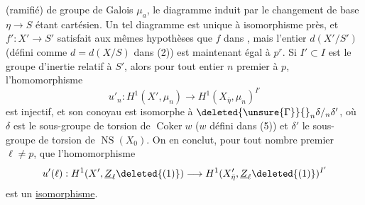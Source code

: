 
  (ramifié) de  groupe de Galois $\mu_a$, le diagramme  induit par le changement de base $\eta\longrightarrow S$ étant cartésien. Un tel diagramme est unique à isomorphisme près,  et $f':X'\longrightarrow S'$ satisfait aux mêmes hypothèses  que $f$ dans \qquad, mais l'entier $d(X'/S')$ (défini comme $d=d(X/S)$ dans (2)) est maintenant  égal à $p^r$.
Si $I'\subset I$ est le groupe d'inertie  relatif à $S'$, alors pour tout entier $n$ premier à $p$, l'homomorphisme
\[
u'_n:H^1(X',\mu_n)\longrightarrow H^1(X_{\bar\eta},\mu_n)^{I'}
\]
est injectif, et son conoyau est isomorphe à $\deleted{\unsure{\Gamma}}{}_n\delta/{}_n\delta'$, où $\delta$ est le sous-groupe de torsion de $\operatorname{Coker}w$ ($w$ défini dans (5)) et $\delta'$ le sous-groupe de torsion de $\operatorname{NS}(X_0)$. On en conclut, pour tout nombre premier $\ell\neq p$,  que l'homomorphisme
\[
u'(\ell):H^1(X',\underline Z_\ell\deleted{(1)})\longrightarrow H^1(X'_{\bar\eta},\underline Z_\ell\deleted{(1)})^{I'}
\]
est un \uline{isomorphisme}.

\margin{$\times\quad\times\quad\times$}
